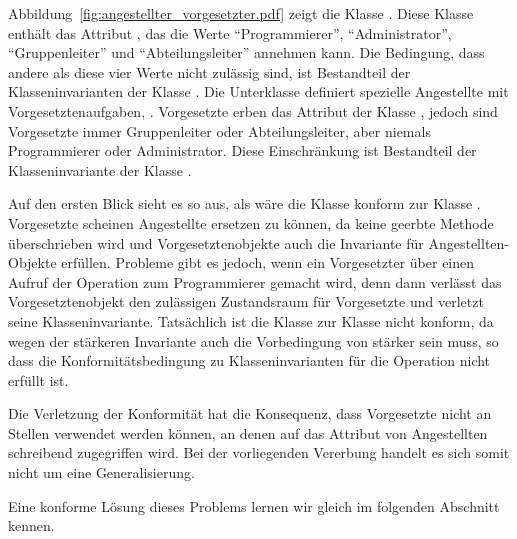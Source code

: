 Abbildung~\ref{fig:angestellter_vorgesetzter.pdf} zeigt die Klasse . Diese Klasse enthält das Attribut , das die Werte "`Programmierer"', "`Administrator"', "`Gruppenleiter"' und "`Abteilungsleiter"' annehmen kann. Die Bedingung, dass andere als diese vier Werte nicht zulässig sind, ist Bestandteil der Klasseninvarianten der Klasse . Die Unterklasse  definiert spezielle Angestellte mit Vorgesetztenaufgaben, \zb {}. Vorgesetzte erben das Attribut  der Klasse , jedoch sind Vorgesetzte immer Gruppenleiter oder Abteilungsleiter, aber niemals Programmierer oder Administrator. Diese Einschränkung ist Bestandteil der Klasseninvariante der Klasse .

Auf den ersten Blick sieht es so aus, als wäre die Klasse  konform zur Klasse . Vorgesetzte scheinen Angestellte ersetzen zu können, da keine geerbte Methode überschrieben wird und Vorgesetztenobjekte auch die Invariante für Angestellten-Objekte erfüllen. Probleme gibt es jedoch, wenn ein Vorgesetzter über einen Aufruf der Operation  \zb zum Programmierer gemacht wird, denn dann verlässt das Vorgesetztenobjekt den zulässigen Zustandsraum für Vorgesetzte und verletzt seine Klasseninvariante. Tatsächlich ist die Klasse  zur Klasse  nicht konform, da wegen der stärkeren Invariante auch die Vorbedingung von  stärker sein muss, so dass die Konformitätsbedingung zu Klasseninvarianten für die Operation nicht erfüllt ist.

Die Verletzung der Konformität hat die Konsequenz, dass Vorgesetzte nicht an Stellen verwendet werden können, an denen auf das Attribut  von Angestellten schreibend zugegriffen wird. Bei der vorliegenden Vererbung handelt es sich somit nicht um eine Generalisierung.

Eine konforme Lösung dieses Problems lernen wir gleich im folgenden Abschnitt kennen.